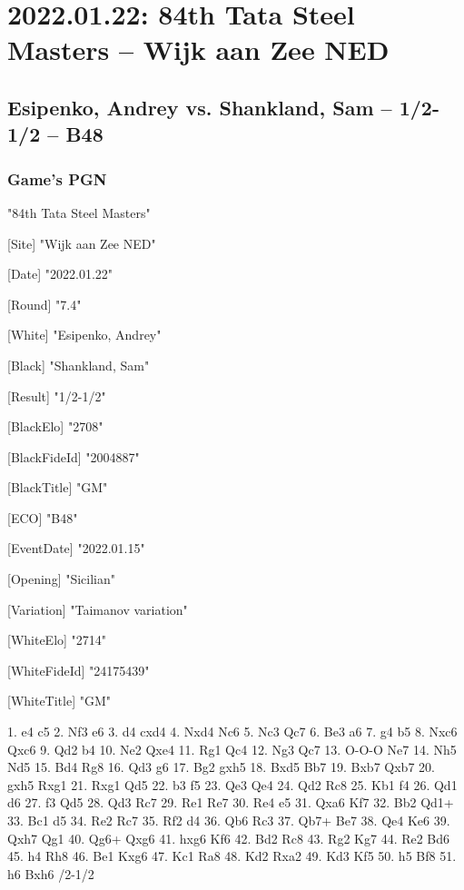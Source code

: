 \documentclass[9pt]{extarticle}
\begin{document}
\section*{2022.01.22: 84th Tata Steel Masters -- Wijk aan Zee NED}

\subsection*{Esipenko, Andrey vs. Shankland, Sam -- 1/2-1/2 -- B48}
\subsubsection*{Game's PGN}
\begin{flushleft}
[Event] "84th Tata Steel Masters"

[Site] "Wijk aan Zee NED"

[Date] "2022.01.22"

[Round] "7.4"

[White] "Esipenko, Andrey"

[Black] "Shankland, Sam"

[Result] "1/2-1/2"

[BlackElo] "2708"

[BlackFideId] "2004887"

[BlackTitle] "GM"

[ECO] "B48"

[EventDate] "2022.01.15"

[Opening] "Sicilian"

[Variation] "Taimanov variation"

[WhiteElo] "2714"

[WhiteFideId] "24175439"

[WhiteTitle] "GM"

\end{flushleft}
\begin{flushleft}
1. e4 c5 2. Nf3 e6 3. d4 cxd4 4. Nxd4 Nc6 5. Nc3 Qc7 6. Be3 a6 7. g4 b5 8. Nxc6 Qxc6 9. Qd2 b4 10. Ne2 Qxe4 11. Rg1 Qc4 12. Ng3 Qc7 13. O-O-O Ne7 14. Nh5 Nd5 15. Bd4 Rg8 16. Qd3 g6 17. Bg2 gxh5 18. Bxd5 Bb7 19. Bxb7 Qxb7 20. gxh5 Rxg1 21. Rxg1 Qd5 22. b3 f5 23. Qe3 Qe4 24. Qd2 Rc8 25. Kb1 f4 26. Qd1 d6 27. f3 Qd5 28. Qd3 Rc7 29. Re1 Re7 30. Re4 e5 31. Qxa6 Kf7 32. Bb2 Qd1+ 33. Bc1 d5 34. Re2 Rc7 35. Rf2 d4 36. Qb6 Rc3 37. Qb7+ Be7 38. Qe4 Ke6 39. Qxh7 Qg1 40. Qg6+ Qxg6 41. hxg6 Kf6 42. Bd2 Rc8 43. Rg2 Kg7 44. Re2 Bd6 45. h4 Rh8 46. Be1 Kxg6 47. Kc1 Ra8 48. Kd2 Rxa2 49. Kd3 Kf5 50. h5 Bf8 51. h6 Bxh6 \quad  {}/2-1/2
\end{flushleft}
\end{document}
